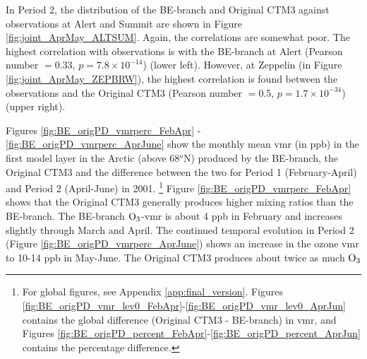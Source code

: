 \medskip

In Period 2, the distribution of the BE-branch and Original CTM3 against observations at Alert and Summit are shown in Figure \ref{fig:joint_AprMay_ALTSUM}. Again, the correlations are somewhat poor. The highest correlation with observations is with the BE-branch at Alert (Pearson number $=0.33$, $p = 7.8\times10^{-14}$) (lower left). However, at Zeppelin (in Figure \ref{fig:joint_AprMay_ZEPBRW}), the highest correlation is found between the observations and the Original CTM3 (Pearson number $=0.5$, $p = 1.7\times10^{-34}$) (upper right). 












\medskip
\medskip

Figures \ref{fig:BE_origPD_vmrperc_FebApr} - \ref{fig:BE_origPD_vmrperc_AprJune} show the monthly mean \acrshort{vmr} (in ppb) in the first model layer in the Arctic (above 68$^o$N) produced by the BE-branch, the Original CTM3 and the difference between the two for Period 1 (February-April) and Period 2 (April-June) in 2001. \footnote{For global figures, see Appendix \ref{app:final_version}. Figures \ref{fig:BE_origPD_vmr_lev0_FebApr}-\ref{fig:BE_origPD_vmr_lev0_AprJun} contains the global difference (Original CTM3 - BE-branch) in \acrshort{vmr}, and Figures \ref{fig:BE_origPD_percent_FebApr}-\ref{fig:BE_origPD_percent_AprJun} contains the percentage difference.} Figure \ref{fig:BE_origPD_vmrperc_FebApr} shows that the Original CTM3 generally produces higher mixing ratios than the BE-branch. The BE-branch $\mathrm{O_3}$-\acrshort{vmr} is about 4 ppb in February and increases slightly through March and April. The continued temporal evolution in Period 2 (Figure \ref{fig:BE_origPD_vmrperc_AprJune}) shows an increase in the ozone \acrshort{vmr} to 10-14 ppb in May-June. The Original CTM3 produces about twice as much $\mathrm{O_3}$





